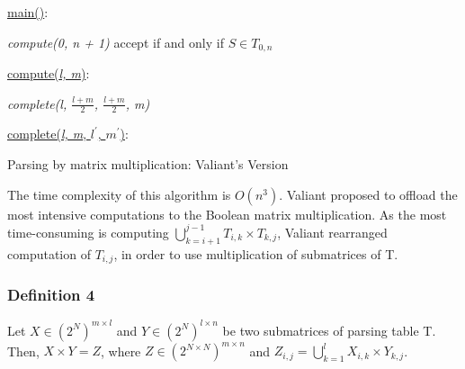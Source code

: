 \begin{algorithm}
\SetAlgoNoLine
{}
\underline{main()}{:}{

 \textit{compute(0, n + 1)\;}
 accept if and only if $S \in T_{0, n}$
 \linebreak
 }

\underline{compute(\textit{l, m})}{:}{

 \textit{complete(l, $\frac{l+m}{2}$, $\frac{l+m}{2}$, m)}
 \linebreak
 }

\underline{complete(\textit{l, m}, $l^\prime$, $m^\prime$)}{:}{

 }
\caption{Parsing by matrix multiplication: Valiant's Version}
\end{algorithm}

The time complexity of this algorithm is $O(n^3)$. Valiant proposed to offload the most intensive computations to the Boolean matrix multiplication. As the most time-consuming is computing $\bigcup\limits_{k = i + 1}^{j - 1} T_{i, k} \times T_{k, j}$, Valiant rearranged computation of $T_{i, j}$, in order to use multiplication of submatrices of T.

\subsubsection{Definition 4} Let $X \in (2^N)^{m \times l}$ and $Y \in (2^N)^{l \times n}$ be two submatrices of parsing table T. Then, $X \times Y = Z$, where $Z \in (2^{N \times N})^{m \times n}$ and $Z_{i, j} = \bigcup\limits_{k = 1}^{l} X_{i, k} \times Y_{k, j}$.

